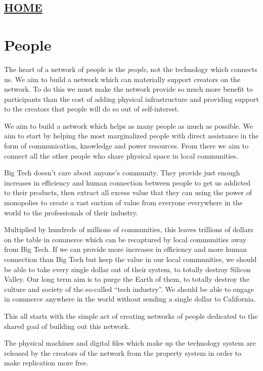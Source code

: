 \hypertarget{home}{%
\subsection{\texorpdfstring{\href{scrolls/home}{HOME}}{HOME}}\label{home}}

\hypertarget{people}{%
\section{People}\label{people}}

The heart of a network of people is the \emph{people}, not the
technology which connects us. We aim to build a network which can
materially support creators on the network. To do this we must make the
network provide so much more benefit to participants than the cost of
adding physical infrastructure and providing support to the creators
that people will do so out of self-interest.

We aim to build a network which helps as many people as much as
possible. We aim to start by helping the most marginalized people with
direct assistance in the form of communication, knowledge and power
resources. From there we aim to connect all the other people who share
physical space in local communities.

Big Tech doesn't care about anyone's community. They provide just enough
increases in efficiency and human connection between people to get us
addicted to their products, then extract all excess value that they can
using the power of monopolies to create a vast suction of value from
everyone everywhere in the world to the professionals of their industry.

Multiplied by hundreds of millions of communities, this leaves trillions
of dollars on the table in commerce which can be recaptured by local
communities away from Big Tech. If we can provide more increases in
efficiency and more human connection than Big Tech but keep the value in
our local communities, we should be able to take every single dollar out
of their system, to totally destroy Silicon Valley. Our long term aim is
to purge the Earth of them, to totally destroy the culture and society
of the so-called ``tech industry''. We should be able to engage in
commerce anywhere in the world without sending a single dollar to
California.

This all starts with the simple act of creating networks of people
dedicated to the shared goal of building out this network.

The physical machines and digital files which make up the technology
system are released by the creators of the network from the property
system in order to make replication more free.

